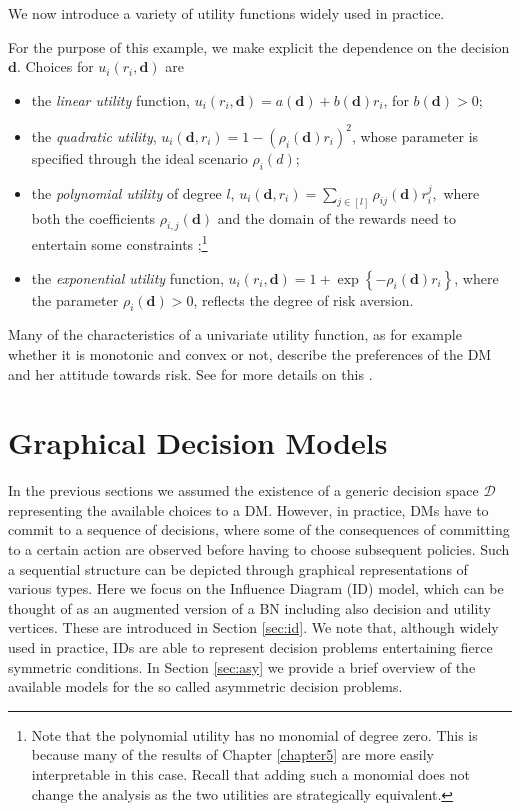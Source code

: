We now introduce a variety of utility functions widely used in practice. 
\begin{example}
For the purpose of this example, we make explicit the dependence on the decision $\bm{d}$. Choices for $u_i(r_i,\bm{d})$ are 
\begin{itemize}
\item the \emph{linear utility} function, $u_i(r_i,\bm{d})= a(\bm{d})+b(\bm{d})r_i$, for $b(\bm{d})>0$;
\item the \emph{quadratic utility},  $u_{i}(\bm{d},r_{i} )=1-(\rho_{i}(\bm{d})r_{i})^{2}$, whose parameter is specified through the ideal scenario $\rho _{i}(d)$;
\item the \emph{polynomial utility} of degree $l$, $ u_i(\bm{d},r_i)=\sum_{j\in[l]}\rho_{ij}(\bm{d})r_i^j,$ where both the coefficients $\rho_{i,j}(\bm{d})$ and the domain of the rewards need to entertain some constraints \citep[see][for a discussion of these, which we omit here since are not relevant for our developments]{Keeney1993a,Muller1987};\footnote{Note that the polynomial utility has no monomial of degree zero. This is because many of the results of Chapter \ref{chapter5} are more easily interpretable in this case. Recall that adding such a monomial does not change the analysis as the two utilities are strategically equivalent.} 
\item the \emph{exponential utility} function, $
u_{i}(r_{i},\bm{d} )=1+\exp \left\{ -\rho _{i}(\bm{d})r_{i}\right\}$, where the parameter $\rho _{i}(\bm{d})>0$, reflects the degree of risk aversion.
\end{itemize}
\end{example}

Many of the characteristics of a univariate utility function, as for example whether it is monotonic and convex or not, describe the preferences of the DM and her attitude towards risk. See for more details on this \citet{Keeney1993a}.

\section{Graphical Decision Models}
\label{sec:dec}
In the previous sections we assumed the existence of a generic decision space $\bm{\mathcal{D}}$ representing the available choices to a DM. However, in practice, DMs have to commit to a sequence of decisions, where some of the consequences of committing to a certain action are observed before having to choose subsequent policies. Such a sequential structure can be depicted through graphical representations of various types. Here we focus on the Influence Diagram (ID) model, which can be thought of as an augmented version of a BN including also decision and utility vertices. 
These are introduced in Section \ref{sec:id}. We  note that, although widely used in practice, IDs are able to represent decision problems entertaining fierce symmetric conditions. In Section \ref{sec:asy} we provide a brief overview of the available models for the so called asymmetric decision problems.
 
